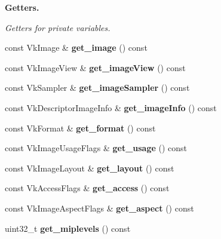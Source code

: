 \begin{Indent}\textbf{ Getters.}\par
{\em Getters for private variables. }\begin{DoxyCompactItemize}
\item 
\mbox{\label{classblaze_1_1TextureCube_a8f491ebf6c24b97590157912c3205aef}} 
const Vk\+Image \& {\bfseries get\+\_\+image} () const
\item 
\mbox{\label{classblaze_1_1TextureCube_ab61042e56e8363ac3f74b2dcab35beed}} 
const Vk\+Image\+View \& {\bfseries get\+\_\+image\+View} () const
\item 
\mbox{\label{classblaze_1_1TextureCube_a19226d2f69a12173be7dc1ebcb810080}} 
const Vk\+Sampler \& {\bfseries get\+\_\+image\+Sampler} () const
\item 
\mbox{\label{classblaze_1_1TextureCube_a6bedfa28b59cb45aecc24532b9692d42}} 
const Vk\+Descriptor\+Image\+Info \& {\bfseries get\+\_\+image\+Info} () const
\item 
\mbox{\label{classblaze_1_1TextureCube_a6fc4f4025abafa9a7a763112276c0223}} 
const Vk\+Format \& {\bfseries get\+\_\+format} () const
\item 
\mbox{\label{classblaze_1_1TextureCube_a52a14123c19506e7495466f626f89a2a}} 
const Vk\+Image\+Usage\+Flags \& {\bfseries get\+\_\+usage} () const
\item 
\mbox{\label{classblaze_1_1TextureCube_a65e42e3d8b4e083b068bf1ab1056911d}} 
const Vk\+Image\+Layout \& {\bfseries get\+\_\+layout} () const
\item 
\mbox{\label{classblaze_1_1TextureCube_ac4efd9f1ae22b9cde6883b4b8dc58adb}} 
const Vk\+Access\+Flags \& {\bfseries get\+\_\+access} () const
\item 
\mbox{\label{classblaze_1_1TextureCube_ab655a09d5acd232d34b930185068472f}} 
const Vk\+Image\+Aspect\+Flags \& {\bfseries get\+\_\+aspect} () const
\item 
\mbox{\label{classblaze_1_1TextureCube_aed94c9af1d67687dfb318f5c66ed1c70}} 
uint32\+\_\+t {\bfseries get\+\_\+miplevels} () const
\end{DoxyCompactItemize}
\end{Indent}


